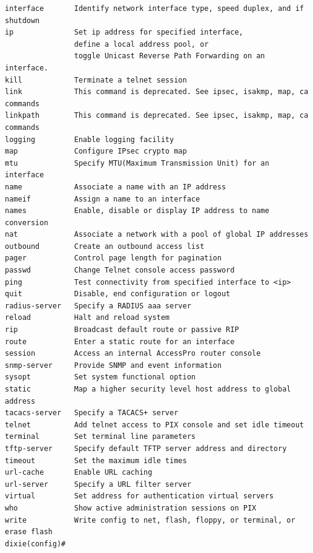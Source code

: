 \begin{verbatim}
interface       Identify network interface type, speed duplex, and if shutdown
ip              Set ip address for specified interface,
                define a local address pool, or
                toggle Unicast Reverse Path Forwarding on an interface.
kill            Terminate a telnet session
link            This command is deprecated. See ipsec, isakmp, map, ca commands
linkpath        This command is deprecated. See ipsec, isakmp, map, ca commands
logging         Enable logging facility
map             Configure IPsec crypto map
mtu             Specify MTU(Maximum Transmission Unit) for an interface
name            Associate a name with an IP address
nameif          Assign a name to an interface
names           Enable, disable or display IP address to name conversion
nat             Associate a network with a pool of global IP addresses
outbound        Create an outbound access list
pager           Control page length for pagination
passwd          Change Telnet console access password
ping            Test connectivity from specified interface to <ip>
quit            Disable, end configuration or logout
radius-server   Specify a RADIUS aaa server
reload          Halt and reload system
rip             Broadcast default route or passive RIP
route           Enter a static route for an interface
session         Access an internal AccessPro router console
snmp-server     Provide SNMP and event information
sysopt          Set system functional option
static          Map a higher security level host address to global address
tacacs-server   Specify a TACACS+ server
telnet          Add telnet access to PIX console and set idle timeout
terminal        Set terminal line parameters
tftp-server     Specify default TFTP server address and directory
timeout         Set the maximum idle times
url-cache       Enable URL caching
url-server      Specify a URL filter server
virtual         Set address for authentication virtual servers
who             Show active administration sessions on PIX
write           Write config to net, flash, floppy, or terminal, or erase flash
dixie(config)#
\end{verbatim}
